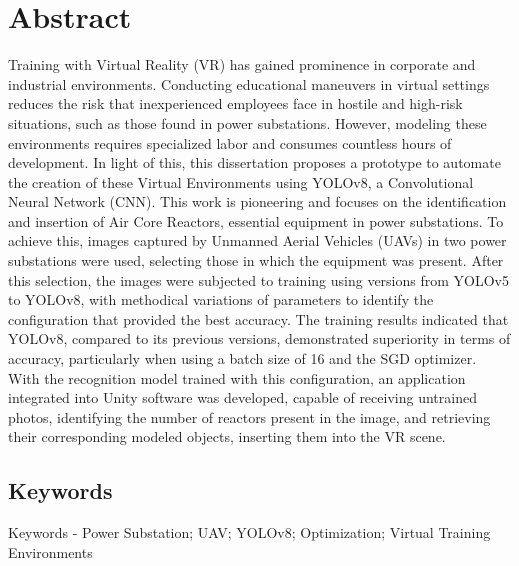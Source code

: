 \newpage
\thispagestyle{empty}
\chapter*{Abstract}
\vspace{-35pt}

Training with Virtual Reality (VR) has gained prominence in corporate and industrial environments. Conducting educational maneuvers in virtual settings reduces the risk that inexperienced employees face in hostile and high-risk situations, such as those found in power substations. However, modeling these environments requires specialized labor and consumes countless hours of development. In light of this, this dissertation proposes a prototype to automate the creation of these Virtual Environments using YOLOv8, a Convolutional Neural Network (CNN). This work is pioneering and focuses on the identification and insertion of Air Core Reactors, essential equipment in power substations. To achieve this, images captured by Unmanned Aerial Vehicles (UAVs) in two power substations were used, selecting those in which the equipment was present. After this selection, the images were subjected to training using versions from YOLOv5 to YOLOv8, with methodical variations of parameters to identify the configuration that provided the best accuracy. The training results indicated that YOLOv8, compared to its previous versions, demonstrated superiority in terms of accuracy, particularly when using a batch size of 16 and the SGD optimizer. With the recognition model trained with this configuration, an application integrated into Unity software was developed, capable of receiving untrained photos, identifying the number of reactors present in the image, and retrieving their corresponding modeled objects, inserting them into the VR scene.

\section*{Keywords}
Keywords - Power Substation; UAV; YOLOv8; Optimization; Virtual Training Environments
